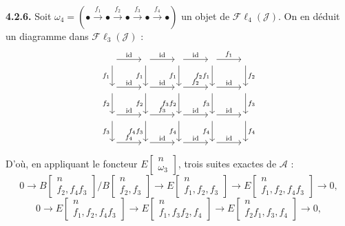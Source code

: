 \medskip\noindent\textbf{4.2.6.}
Soit
$\omega_4=(\mathord\bullet\xrightarrow{f_1}\mathord\bullet
\xrightarrow{f_2}\mathord\bullet\xrightarrow{f_3}\mathord\bullet
\xrightarrow{f_4}\mathord\bullet)$
un objet de $\mathcal{F}\ell_4(\mathcal J)$. On en déduit un diagramme dans
$\mathcal{F}\ell_3(\mathcal J)$ :
\[
\begin{tikzcd}[column sep=2.6em,row sep=2.15em]
{}\arrow[r,"\mathrm{id}"]\arrow[d,"f_1"']&
{}\arrow[r,"\mathrm{id}"]\arrow[d,"f_1"']&
{}\arrow[r,"\mathrm{id}"]\arrow[d,"f_1"']&
{}\arrow[r,"f_1"]\arrow[d,"f_2f_1"']&
{}\arrow[d,"f_2"]\\
{}\arrow[r,"\mathrm{id}"]\arrow[d,"f_2"']&
{}\arrow[r,"\mathrm{id}"]\arrow[d,"f_2"']&
{}\arrow[r,"f_2"]\arrow[d,"f_3f_2"']&
{}\arrow[r,"\mathrm{id}"]\arrow[d,"f_3"']&
{}\arrow[d,"f_3"]\\
{}\arrow[r,"\mathrm{id}"]\arrow[d,"f_3"']&
{}\arrow[r,"f_3"]\arrow[d,"f_4f_3"']&
{}\arrow[r,"\mathrm{id}"]\arrow[d,"f_4"']&
{}\arrow[r,"\mathrm{id}"]\arrow[d,"f_4"']&
{}\arrow[d,"f_4"]\\
{}\arrow[r,"f_4"]&
{}\arrow[r,"\mathrm{id}"]&
{}\arrow[r,"\mathrm{id}"]&
{}\arrow[r,"\mathrm{id}"]&{}
\end{tikzcd}
\]
D'où, en appliquant le foncteur
$E\!\begin{bmatrix}n\\ \omega_3\end{bmatrix}$, trois suites exactes de
$\mathcal A$ :
\[
0\longrightarrow
B\!\begin{bmatrix}n\\ f_2,f_4f_3\end{bmatrix}
 \Big/
B\!\begin{bmatrix}n\\ f_2,f_3\end{bmatrix}
\longrightarrow
E\!\begin{bmatrix}n\\ f_1,f_2,f_3\end{bmatrix}
\longrightarrow
E\!\begin{bmatrix}n\\ f_1,f_2,f_4f_3\end{bmatrix}
\longrightarrow0,
\]
\[
0\longrightarrow
E\!\begin{bmatrix}n\\ f_1,f_2,f_4f_3\end{bmatrix}
\longrightarrow
E\!\begin{bmatrix}n\\ f_1,f_3f_2,f_4\end{bmatrix}
\longrightarrow
E\!\begin{bmatrix}n\\ f_2f_1,f_3,f_4\end{bmatrix}
\longrightarrow0,
\]
\endgroup
